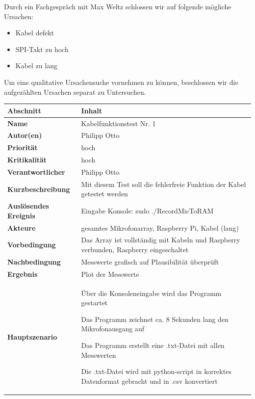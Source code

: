 Durch ein Fachgespräch mit Max Weltz schlossen wir auf folgende mögliche Ursachen:

\begin{itemize}
	\item Kabel defekt
	\item SPI-Takt zu hoch
	\item Kabel zu lang
\end{itemize}

Um eine qualitative Ursachensuche vornehmen zu können, beschlossen wir die aufgezählten Ursachen separat zu Untersuchen.

\begin{tabularx}{\columnwidth}{|p{4cm}|X|}
	\hline
	\textbf{Abschnitt} & \textbf{Inhalt}\\
	\hline
	\textbf{Name} & Kabelfunktionstest Nr. 1\\
	\hline
	\textbf{Autor(en)} & Philipp Otto\\
	\hline
	\textbf{Priorität} & hoch\\	
	\hline	
	\textbf{Kritikalität} & hoch\\
	\hline
	\textbf{Verantwortlicher} & Philipp Otto\\
	\hline
	\textbf{Kurzbeschreibung} & Mit diesem Test soll die fehlerfreie Funktion der Kabel getestet werden\\
	\hline
	\textbf{Auslösendes Ereignis} & Eingabe Konsole: \glqq sudo ./RecordMicToRAM\grqq\\
	\hline
	\textbf{Akteure} & gesamtes Mikrofonarray, Raspberry Pi, Kabel (lang)\\
	\hline
	\textbf{Vorbedingung} & Das Array ist vollständig mit Kabeln und Raspberry verbunden, Raspberry eingeschaltet\\
	\hline
	\textbf{Nachbedingung} & Messwerte grafisch auf Plausibilität überprüft
	\\
	\hline
	\textbf{Ergebnis} & Plot der Messwerte\\
	\hline
	\textbf{Hauptszenario} & \begin{description}[font=\normalfont]
		\item[1.] Über die Konsoleneingabe wird das Programm gestartet
		\item[2.] Das Programm zeichnet ca. 8 Sekunden lang den Mikrofonausgang auf
		\item[3.] Das Programm erstellt eine .txt-Datei mit allen Messwerten
		\item[4.] Die .txt-Datei wird mit python-script in korrektes Datenformat gebracht und in .csv konvertiert

\end{description}
\end{tabularx}
